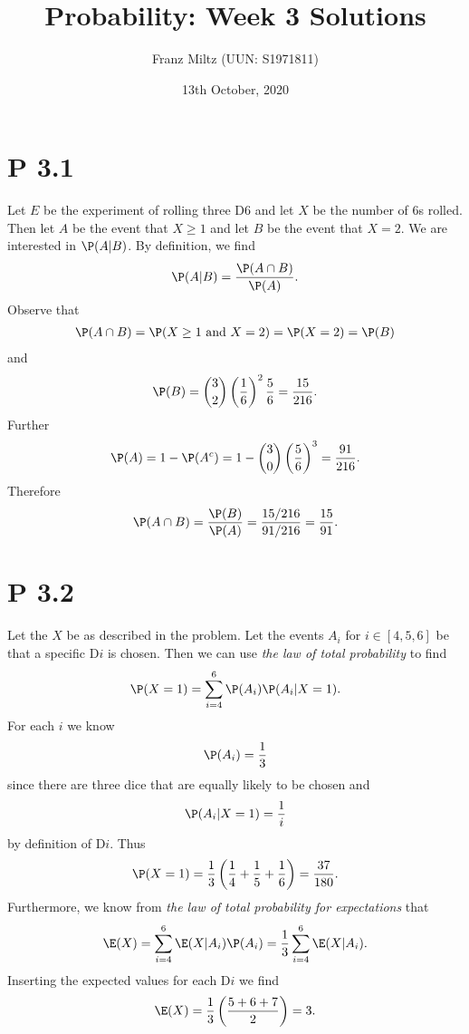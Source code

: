 \documentclass{article}
\begin{document}
\title{Probability: Week 3 Solutions}
\author{Franz Miltz (UUN: S1971811)}
\date{13th October, 2020}
\maketitle


\section*{P 3.1}


Let $E$ be the experiment of rolling three D6 and let $X$ be the number of 6s rolled.
Then let $A$ be the event that $X\geq 1$ and let $B$ be the event that $X=2$.
We are interested in $\P(A|B)$. By definition, we find
\begin{align*}
  \P(A|B) = \frac{\P(A\cap B)}{\P(A)}.
\end{align*}
Observe that
\begin{align*}
  \P(A\cap B) = \P(X\geq 1 \text{ and } X = 2) = \P(X=2) = \P(B)
\end{align*}
and
\begin{align*}
  \P(B) = \binom{3}{2}\left(\frac{1}{6}\right)^2\frac{5}{6}=\frac{15}{216}.
\end{align*}
Further
\begin{align*}
  \P(A) = 1-\P(A^c) = 1-\binom{3}{0}\left(\frac{5}{6}\right)^3=\frac{91}{216}.
\end{align*}
Therefore
\begin{align*}
  \P(A\cap B) = \frac{\P(B)}{\P(A)}= \frac{15/216}{91/216} = \frac{15}{91}.
\end{align*}


\section*{P 3.2}


Let the $X$ be as described in the problem. Let the events
$A_i$ for $i\in[4,5,6]$ be that a specific D$i$ is chosen.
Then we can use \emph{the law of total probability} to find
\begin{align*}
  \P(X=1)=\sum_{i=4}^6\P(A_i)\P(A_i|X=1).
\end{align*}
For each $i$ we know
\begin{align*}
  \P(A_i) = \frac{1}{3}
\end{align*}
since there are three dice that are equally likely to be chosen and
\begin{align*}
  \P(A_i|X=1) = \frac{1}{i}
\end{align*}
by definition of D$i$.
Thus
\begin{align*}
  \P(X=1) = \frac{1}{3}\left(\frac{1}{4}+\frac{1}{5}+\frac{1}{6}\right)=\frac{37}{180}.
\end{align*}
Furthermore, we know from \emph{the law of total probability for expectations} that
\begin{align*}
  \E(X) = \sum_{i=4}^6 \E(X|A_i)\P(A_i) = \frac{1}{3}\sum_{i=4}^6\E(X|A_i).
\end{align*}
Inserting the expected values for each D$i$ we find
\begin{align*}
  \E(X) = \frac{1}{3}\left(\frac{5 + 6 + 7}{2}\right)=3.
\end{align*}
\end{document}
